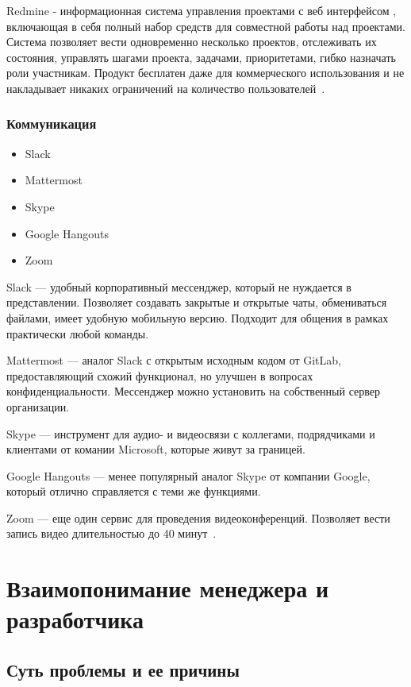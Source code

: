 \documentclass[]{../industrial-development}
\begin{document}
Redmine - информационная система управления проектами с веб интерфейсом , включающая в себя полный набор средств для совместной работы над проектами. Система позволяет вести одновременно несколько проектов, отслеживать их состояния, управлять шагами проекта, задачами, приоритетами, гибко назначать роли участникам. Продукт бесплатен даже для коммерческого использования и не накладывает никаких ограничений на количество пользователей~\cite{NetologyInstruments}.

\begin{frame} \frametitle{Коммуникация} 
\begin{itemize}
\item Slack
\item Mattermost
\item Skype
\item Google Hangouts
\item Zoom
\end{itemize}
\end{frame}

\lecturenotes

Slack — удобный корпоративный мессенджер, который не нуждается в представлении. Позволяет создавать закрытые и открытые чаты, обмениваться файлами, имеет удобную мобильную версию. Подходит для общения в рамках практически любой команды.

Mattermost — аналог Slack с открытым исходным кодом от GitLab, предоставляющий схожий функционал, но улучшен в вопросах конфиденциальности. Мессенджер можно установить на собственный сервер организации.

Skype — инструмент для аудио- и видеосвязи с коллегами, подрядчиками и клиентами от комании Microsoft, которые живут за границей.

Google Hangouts — менее популярный аналог Skype от компании Google, который отлично справляется с теми же функциями. 

Zoom — еще один сервис для проведения видеоконференций. Позволяет вести запись видео длительностью до 40 минут~\cite{NetologyInstruments}.

\section{Взаимопонимание менеджера и разработчика}
\subsection{Суть проблемы и ее причины}
\end{document}
